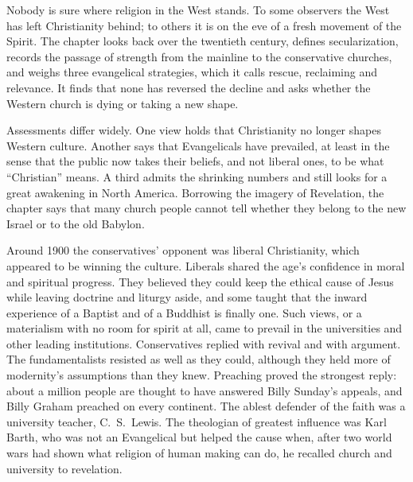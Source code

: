 
\begin{inbrief}
Nobody is sure where religion in the West stands. To some observers the West has left Christianity
behind; to others it is on the eve of a fresh movement of the Spirit. The chapter looks back over the
twentieth century, defines secularization, records the passage of strength from the mainline to the
conservative churches, and weighs three evangelical strategies, which it calls rescue, reclaiming and
relevance. It finds that none has reversed the decline and asks whether the Western church is dying
or taking a new shape.
\end{inbrief}

Assessments differ widely. One view holds that Christianity no longer shapes Western culture. Another
says that Evangelicals have prevailed, at least in the sense that the public now takes their beliefs,
and not liberal ones, to be what ``Christian'' means. A third admits the shrinking numbers and still
looks for a great awakening in North America. Borrowing the imagery of Revelation, the chapter says
that many church people cannot tell whether they belong to the new Israel or to the old Babylon.

Around 1900 the conservatives' opponent was liberal Christianity, which appeared to be winning the
culture. Liberals shared the age's confidence in moral and spiritual progress. They believed they
could keep the ethical cause of Jesus while leaving doctrine and liturgy aside, and some taught that
the inward experience of a Baptist and of a Buddhist is finally one. Such views, or a materialism
with no room for spirit at all, came to prevail in the universities and other leading institutions.
Conservatives replied with revival and with argument. The fundamentalists resisted as well as they
could, although they held more of modernity's assumptions than they knew. Preaching proved the
strongest reply: about a million people are thought to have answered Billy Sunday's appeals, and
Billy Graham preached on every continent. The ablest defender of the faith was a university teacher,
C.~S.~Lewis. The theologian of greatest influence was Karl Barth, who was not an Evangelical but
helped the cause when, after two world wars had shown what religion of human making can do, he
recalled church and university to revelation.

